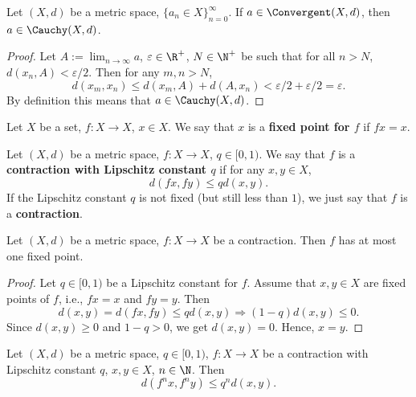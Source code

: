 \begin{proposition}
  Let
    $(X, d)$ be a metric space,
    $\{a_n \in X\}_{n = 0}^\infty$.
  If $a \in \Convergent(X, d)$, then $a \in \Cauchy(X, d)$.
\end{proposition}
\begin{proof}
  Let
    $A := \lim_{n \to \infty} a$,
    $\varepsilon \in \R^+$,
    $N \in \N^+$ be such that for all $n > N$, $d(x_n, A) < \varepsilon / 2$.
  Then for any $m, n > N$,
  \begin{equation}
    d(x_m, x_n)
    \leq d(x_m, A) + d(A, x_n)
    < \varepsilon / 2 + \varepsilon / 2
    = \varepsilon.
  \end{equation}
  By definition this means that $a \in \Cauchy(X, d)$.
\end{proof}
\begin{definition}
  Let
    $X$ be a set,
    $f \colon X \to X$,
    $x \in X$.
  We say that $x$ is a \textbf{fixed point for $f$} if $f x= x$.
\end{definition}
\begin{definition}
  Let $(X, d)$ be a metric space, $f \colon X \to X$, $q \in [0, 1)$.
  We say that $f$ is a \textbf{contraction with Lipschitz constant $q$} if
  for any $x, y \in X$,
  \begin{equation}
    d(f x, f y) \leq q d(x, y).
  \end{equation}
  If the Lipschitz constant $q$ is not fixed (but still less than $1$),
  we just say that $f$ is a \textbf{contraction}.
\end{definition}
\begin{theorem}
  Let
    $(X, d)$ be a metric space,
    $f \colon X \to X$ be a contraction.
  Then $f$ has at most one fixed point.
\end{theorem}
\begin{proof}
  Let $q \in [0, 1)$ be a Lipschitz constant for $f$.
  Assume that $x, y \in X$ are fixed points of $f$,
  i.e., $f x = x$ and $f y = y$.
  Then
  \begin{equation}
    d(x, y) = d(f x, f y) \leq q d(x, y)
    \Rightarrow (1 - q) d(x, y) \leq 0.
  \end{equation}
  Since $d(x, y) \geq 0$ and $1 - q > 0$, we get $d(x, y) = 0$.
  Hence, $x = y$.
\end{proof}
\begin{proposition}
  Let
    $(X, d)$ be a metric space,
    $q \in [0, 1)$,
    $f \colon X \to X$ be a contraction with Lipschitz constant $q$,
    $x, y \in X$,
    $n \in \N$.
  Then
  \begin{equation}
    d(f^n x, f^n y) \leq q^n d(x, y).
  \end{equation}
\end{proposition}
